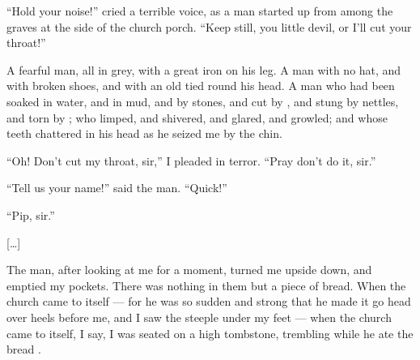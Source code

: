 \documentclass{fiche}
\begin{document}
\begin{texte}
``Hold your noise!'' cried a terrible voice, as a man started up from among the graves at the
side of the church porch. ``Keep still, you little devil, or I'll cut your throat!''

A fearful man, all in  grey, with a great iron on his
leg. A man with no hat, and with broken shoes, and with an old 
tied round his head. A man who had been soaked in water, and
 in mud, and
 by stones, and cut by , and
stung by nettles, and torn by ; who limped, and shivered, and
glared, and growled; and whose teeth chattered in his head as he seized me by the chin.

``Oh! Don't cut my throat, sir,'' I pleaded in terror. ``Pray don't do it, sir.''

``Tell us your name!'' said the man. ``Quick!''

``Pip, sir.''

[\ldots]

The man, after looking at me for a moment, turned me upside down, and emptied my pockets.
There was nothing in them but a piece of bread. When the church came to itself --- for he was
so sudden and strong that he made it go head over heels before me, and I saw the steeple under
my feet --- when the church came to itself, I say, I was seated on a high tombstone,
trembling while he ate the bread .
\end{texte}

\end{document}
